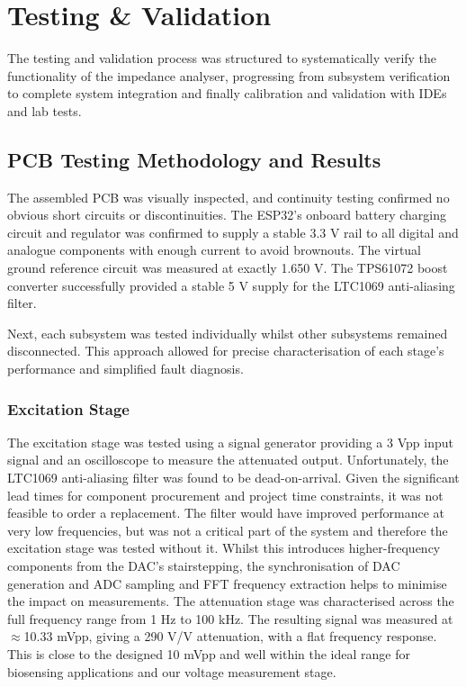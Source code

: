 \graphicspath{{testing_and_validation/fig/}}

\chapter{Testing \& Validation}

The testing and validation process was structured to systematically verify the functionality of the impedance analyser, progressing from subsystem verification to complete system integration and finally calibration and validation with \acp{IDE} and lab tests.


\section{PCB Testing Methodology and Results}

The assembled PCB was visually inspected, and continuity testing confirmed no obvious short circuits or discontinuities. The ESP32's onboard battery charging circuit and regulator was confirmed to supply a stable 3.3 V rail to all digital and analogue components with enough current to avoid brownouts. The virtual ground reference circuit was measured at exactly 1.650 V. The TPS61072 boost converter successfully provided a stable 5 V supply for the LTC1069 anti-aliasing filter.

Next, each subsystem was tested individually whilst other subsystems remained disconnected. This approach allowed for precise characterisation of each stage's performance and simplified fault diagnosis.

\subsection{Excitation Stage} 
The excitation stage was tested using a signal generator providing a 3 Vpp input signal and an oscilloscope to measure the attenuated output. Unfortunately, the LTC1069 anti-aliasing filter was found to be dead-on-arrival. Given the significant lead times for component procurement and project time constraints, it was not feasible to order a replacement. The filter would have improved performance at very low frequencies, but was not a critical part of the system and therefore the excitation stage was tested without it. Whilst this introduces higher-frequency components from the DAC's stairstepping, the synchronisation of DAC generation and ADC sampling and FFT frequency extraction helps to minimise the impact on measurements.
The attenuation stage was characterised across the full frequency range from 1 Hz to 100 kHz. The resulting signal was measured at $\approx$10.33 mVpp, giving a 290 V/V attenuation, with a flat frequency response. This is close to the designed 10 mVpp and well within the ideal range for biosensing applications and our voltage measurement stage.

